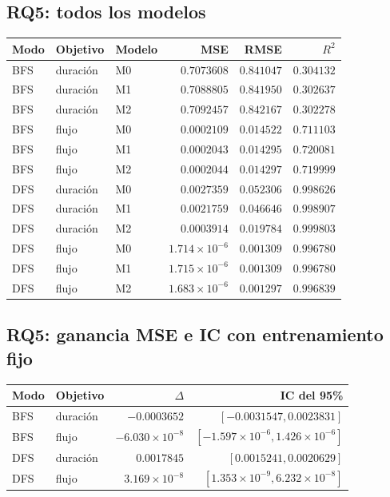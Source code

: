 \documentclass[11pt,a4paper]{article}
\begin{document}
\subsection{RQ5: todos los modelos}
{\small\setlength{\tabcolsep}{5pt}
\begin{longtable}{lllrrr}
\toprule
Modo & Objetivo & Modelo & MSE & RMSE & $R^2$ \\
\midrule\endhead
BFS & duración & M0 & $0.7073608$ & $0.841047$ & $0.304132$ \\
BFS & duración & M1 & $0.7088805$ & $0.841950$ & $0.302637$ \\
BFS & duración & M2 & $0.7092457$ & $0.842167$ & $0.302278$ \\
BFS & flujo & M0 & $0.0002109$ & $0.014522$ & $0.711103$ \\
BFS & flujo & M1 & $0.0002043$ & $0.014295$ & $0.720081$ \\
BFS & flujo & M2 & $0.0002044$ & $0.014297$ & $0.719999$ \\
DFS & duración & M0 & $0.0027359$ & $0.052306$ & $0.998626$ \\
DFS & duración & M1 & $0.0021759$ & $0.046646$ & $0.998907$ \\
DFS & duración & M2 & $0.0003914$ & $0.019784$ & $0.999803$ \\
DFS & flujo & M0 & $1.714\times10^{-6}$ & $0.001309$ & $0.996780$ \\
DFS & flujo & M1 & $1.715\times10^{-6}$ & $0.001309$ & $0.996780$ \\
DFS & flujo & M2 & $1.683\times10^{-6}$ & $0.001297$ & $0.996839$ \\
\bottomrule
\end{longtable}}

\subsection{RQ5: ganancia MSE e IC con entrenamiento fijo}
{\small\setlength{\tabcolsep}{5pt}
\begin{longtable}{llrr}
\toprule
Modo & Objetivo & $\Delta$ & IC del 95\% \\
\midrule\endhead
BFS & duración & $-0.0003652$ & $[-0.0031547, 0.0023831]$ \\
BFS & flujo & $-6.030\times10^{-8}$ & $[-1.597\times10^{-6}, 1.426\times10^{-6}]$ \\
DFS & duración & $0.0017845$ & $[0.0015241, 0.0020629]$ \\
DFS & flujo & $3.169\times10^{-8}$ & $[1.353\times10^{-9}, 6.232\times10^{-8}]$ \\
\bottomrule
\end{longtable}}
\end{document}
